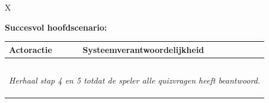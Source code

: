 \begin{xltabular}{\textwidth}{ X }
   \hline

   \textbf{Succesvol hoofdscenario:}

   {\begin{tabularx}{\linewidth}{ XX }
         \textbf{Actoractie}                            & \textbf{Systeemverantwoordelijkheid}                                                        \\

         \hline

         \usecasestep{Speler start een nieuwe quiz.}    &                                                                                             \\
                                                        & \usecasestep{Systeem schrijft 40 credits van de speler af.}                                 \\
                                                        & \usecasestep{Systeem laat een korte uitleg van het spelverloop en de vraagstellingen zien.} \\
                                                        & \usecasestep{Systeem laat een nieuwe quizvraag zien.}                                       \\
         \usecasestep{Speler beantwoordt de quizvraag.} &                                                                                             \\
         \multicolumn{2}{c}{\textit{Herhaal stap 4 en 5 totdat de speler alle quizvragen heeft beantwoord.}}                                          \\
                                                        & \usecasestep{Systeem laat de behaalde letters zien.}                                        \\
         \usecasestep{Speler legt een woord.}           &                                                                                             \\
                                                        & \usecasestep{Systeem laat de behaalde score zien.}                                          \\
      \end{tabularx}}                     \\

   \hline


\end{xltabular}
